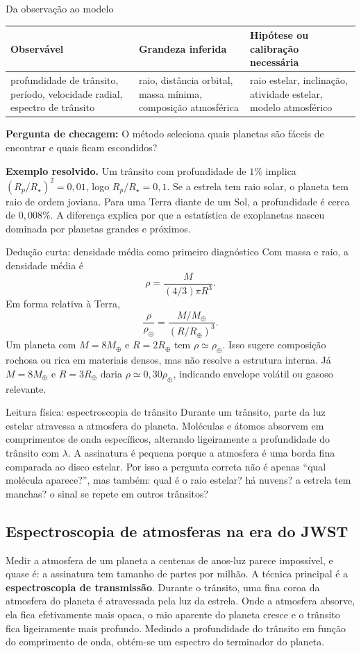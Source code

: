 \documentclass[11pt,a4paper]{article}
\newcommand{\observaveis}[4]{%
  \begin{lessonblock}[borderline west={2pt}{0pt}{astroBlue}]{Da observação ao modelo}%
  \begin{tabular}{>{\raggedright\arraybackslash}p{0.27\textwidth}>{\raggedright\arraybackslash}p{0.27\textwidth}>{\raggedright\arraybackslash}p{0.34\textwidth}}
  \toprule
  Observável & Grandeza inferida & Hipótese ou calibração necessária \\
  \midrule
  #1 & #2 & #3 \\
  \bottomrule
  \end{tabular}

  \textbf{Pergunta de checagem:} #4
  \end{lessonblock}
}
\begin{document}
\observaveis{profundidade de trânsito, período, velocidade radial, espectro de trânsito}{raio, distância orbital, massa mínima, composição atmosférica}{raio estelar, inclinação, atividade estelar, modelo atmosférico}{O método seleciona quais planetas são fáceis de encontrar e quais ficam escondidos?}

\textbf{Exemplo resolvido.} Um trânsito com profundidade de $1\%$ implica $(R_p/R_\star)^2=0{,}01$, logo $R_p/R_\star=0{,}1$. Se a estrela tem raio solar, o planeta tem raio de ordem joviana. Para uma Terra diante de um Sol, a profundidade é cerca de $0{,}008\%$. A diferença explica por que a estatística de exoplanetas nasceu dominada por planetas grandes e próximos.

\begin{lessonblock}[borderline west={2pt}{0pt}{astroGold}]{Dedução curta: densidade média como primeiro diagnóstico}
Com massa e raio, a densidade média é
\[
\rho=\frac{M}{(4/3)\pi R^3}.
\]
Em forma relativa à Terra,
\[
\frac{\rho}{\rho_\oplus}=\frac{M/M_\oplus}{(R/R_\oplus)^3}.
\]
Um planeta com $M=8M_\oplus$ e $R=2R_\oplus$ tem $\rho\simeq\rho_\oplus$. Isso sugere composição rochosa ou rica em materiais densos, mas não resolve a estrutura interna. Já $M=8M_\oplus$ e $R=3R_\oplus$ daria $\rho\simeq0{,}30\rho_\oplus$, indicando envelope volátil ou gasoso relevante.
\end{lessonblock}

\begin{lessonblock}{Leitura física: espectroscopia de trânsito}
Durante um trânsito, parte da luz estelar atravessa a atmosfera do planeta. Moléculas e átomos absorvem em comprimentos de onda específicos, alterando ligeiramente a profundidade do trânsito com $\lambda$. A assinatura é pequena porque a atmosfera é uma borda fina comparada ao disco estelar. Por isso a pergunta correta não é apenas ``qual molécula aparece?'', mas também: qual é o raio estelar? há nuvens? a estrela tem manchas? o sinal se repete em outros trânsitos?
\end{lessonblock}
\subsection*{Espectroscopia de atmosferas na era do JWST}

Medir a atmosfera de um planeta a centenas de anos-luz parece impossível, e quase é: a assinatura tem tamanho de partes por milhão. A técnica principal é a \textbf{espectroscopia de transmissão}. Durante o trânsito, uma fina coroa da atmosfera do planeta é atravessada pela luz da estrela. Onde a atmosfera absorve, ela fica efetivamente mais opaca, o raio aparente do planeta cresce e o trânsito fica ligeiramente mais profundo. Medindo a profundidade do trânsito em função do comprimento de onda, obtém-se um espectro do terminador do planeta.
\end{document}
